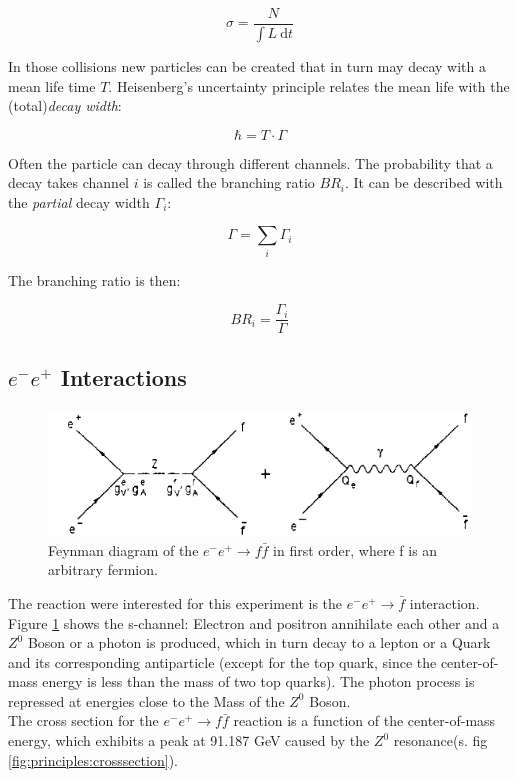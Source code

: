 \begin{equation}
\sigma = \frac{N}{\int L~\text{d}t}
\end{equation}

In those collisions new particles can be created that in turn may decay with a mean life time $T$.
Heisenberg's uncertainty principle relates the mean life with the (total)\emph{decay width}:

\begin{equation}
\hbar=T\cdot\Gamma
\end{equation}

Often the particle can decay through different channels. The probability that a decay takes channel $i$ is called the branching ratio $BR_i$. It can be described with the \emph{partial} decay width $\Gamma_i$:

\begin{equation}
\Gamma = \sum_i \Gamma_i
\end{equation}

The branching ratio is then:

\begin{equation}
BR_i=\frac{\Gamma_i}{\Gamma}
\label{eq:principles:branching ratio}
\end{equation}

\subsection{$e^-e^+$ Interactions}
\label{sec:ee interaction}
\begin{figure}[ht]
	\centering
	\includegraphics{graphics/annihilation.png}
	\caption[Feynman diagramm: $e^-e^+ \rightarrow f\bar{f} $(s-channel)]{Feynman diagram of the $e^-e^+ \rightarrow f\bar{f}$ in first order, where f is an arbitrary fermion.} 
	\label{fig:principles:annihilation.png}
\end{figure}

The reaction were interested for this experiment is the $e^-e^+\rightarrow\bar{f}$ interaction. Figure \ref{fig:principles:annihilation.png} shows the s-channel: Electron and positron annihilate each other and a $Z^0$ Boson or a photon is produced, which in turn decay to a lepton or a Quark and its corresponding antiparticle (except for the top quark, since the center-of-mass energy is less than the mass of two top quarks). The photon process is repressed at energies close to the Mass of the $Z^0$ Boson\cite{muenchen}.\\%
The cross section for the $e^-e^+\rightarrow f\bar{f}$ reaction is a function of the center-of-mass energy, which exhibits a peak at 91.187 GeV caused by the $Z^0$ resonance(s. fig \ref{fig:principles:crosssection}).

